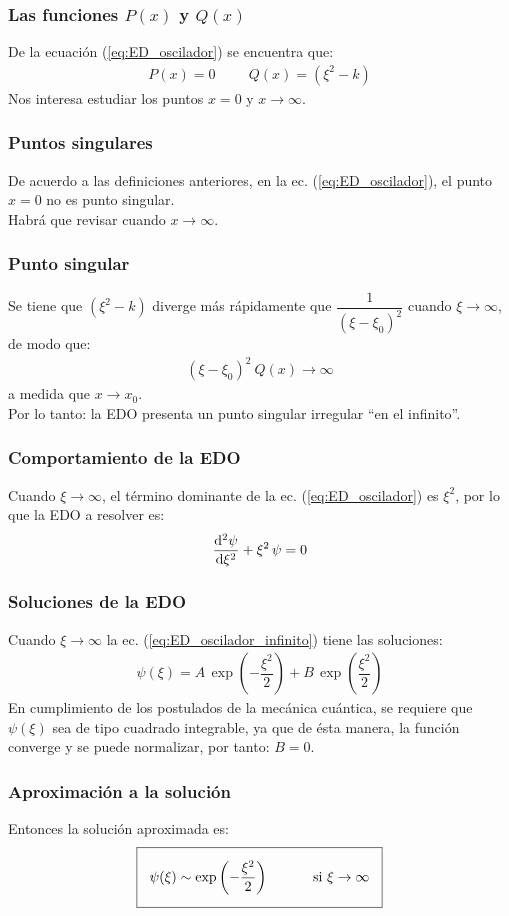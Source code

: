 \documentclass[12pt]{beamer}
\begin{document}
\begin{frame}
\frametitle{Las funciones $P(x)$ y $Q(x)$}
De la ecuación (\ref{eq:ED_oscilador}) se encuentra que:
\pause
\begin{align*}
P(x) = 0 \hspace{1cm} Q(x) = (\xi^{2} - k)
\end{align*}
\pause
Nos interesa estudiar los puntos $x = 0$ y $x \to \infty$.
\end{frame}
\begin{frame}
\frametitle{Puntos singulares}
De acuerdo a las definiciones anteriores, en la ec. (\ref{eq:ED_oscilador}), el punto $x = 0$ no es punto singular.
\\
\bigskip
\pause
Habrá que revisar cuando $x \to \infty$.
\end{frame}
\begin{frame}
\frametitle{Punto singular}
Se tiene que $(\xi^{2} - k)$ diverge más rápidamente que $\dfrac{1}{(\xi - \xi_{0})^{2}}$ cuando $\xi \to \infty$, de modo que:
\pause
\begin{align*}
(\xi - \xi_{0})^{2} \: Q(x) \to \infty
\end{align*}
a medida que $x \to x_{0}$.
\pause
\\
Por lo tanto: la EDO presenta un punto singular irregular \enquote{en el infinito}.
\end{frame}
\begin{frame}
\frametitle{Comportamiento de la EDO}
Cuando $\xi \to \infty$, el término dominante de la ec. (\ref{eq:ED_oscilador}) es $\xi^{2}$, por lo que la EDO a resolver es:
\pause
\begin{align}
\dv[2]{\psi}{\xi} +  \xi^{2} \, \psi = 0
\label{eq:ED_oscilador_infinito}
\end{align}
\end{frame}
\begin{frame}
\frametitle{Soluciones de la EDO}
Cuando $\xi \to \infty$ la ec. (\ref{eq:ED_oscilador_infinito}) tiene las soluciones:
\pause
\begin{align*}
\psi(\xi) = A \, \exp \left( - \dfrac{\xi^{2}}{2} \right) + B \, \exp \left( \dfrac{\xi^{2}}{2} \right) 
\end{align*}
\pause
En cumplimiento de los postulados de la mecánica cuántica, se requiere que $\psi(\xi)$ sea de tipo cuadrado integrable, \pause ya que de ésta manera, la función converge y se puede normalizar, \pause por tanto: $B = 0$.
\end{frame}
\begin{frame}
\frametitle{Aproximación a la solución}
Entonces la solución aproximada es:
\begin{align}
\setlength{\fboxsep}{3\fboxsep}\boxed{
\psi (\xi) \sim \exp \left( - \dfrac{\xi^{2}}{2} \right) \hspace{1cm} \mbox{ si } \xi \to \infty}
\end{align}
\end{frame}
\end{document}
